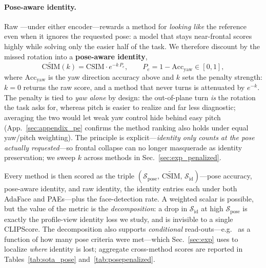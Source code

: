 \paragraph{Pose-aware identity.} Raw \csim{}---under either encoder---rewards
a method for \emph{looking like} the reference even when it ignores the
requested pose: a model that stays near-frontal scores highly while solving
only the easier half of the task. We therefore discount \csim{} by the missed
rotation into a \textbf{pose-aware identity},
\begin{equation}
\widetilde{\mathrm{CSIM}}(k)=\mathrm{CSIM}\cdot e^{-k\,P_e},\qquad
P_e=1-\mathrm{Acc_{yaw}}\in[0,1],
\label{eq:posepenalty}
\end{equation}
where $\mathrm{Acc_{yaw}}$ is the yaw direction accuracy above and $k$ sets
the penalty strength: $k{=}0$ returns the raw score, and a method that never
turns is attenuated by $e^{-k}$. The penalty is tied to \emph{yaw alone} by
design: the out-of-plane turn \emph{is} the rotation the task asks for,
whereas pitch is easier to realize and far less diagnostic; averaging the two
would let weak yaw control hide behind easy pitch
(App.~\ref{sec:appendix_pe} confirms the method ranking also holds under equal
yaw/pitch weighting). The principle is explicit---\emph{identity only counts
at the pose actually requested}---so frontal collapse can no longer masquerade
as identity preservation; we sweep $k$ across methods in
Sec.~\ref{sec:exp_penalized}.

Every method is then scored as the triple
$(\mathcal{S}_{\mathrm{pose}},\,\widetilde{\mathrm{CSIM}},\,
\mathcal{S}_{\mathrm{id}})$---pose accuracy, pose-aware identity, and raw
identity, the identity entries each under both AdaFace and PAEs---plus the
face-detection rate. A weighted scalar is possible, but the value of the
metric is the \emph{decomposition}: a drop in $\mathcal{S}_{\mathrm{id}}$ at
high $\mathcal{S}_{\mathrm{pose}}$ is exactly the profile-view identity loss
we study, and is invisible to a single CLIPScore. The decomposition also
supports \emph{conditional} read-outs---e.g.\ \csim{} as a function of how
many pose criteria were met---which Sec.~\ref{sec:exp} uses to localize
\emph{where} identity is lost; aggregate cross-method scores are reported in
Tables~\ref{tab:sota_pose} and~\ref{tab:posepenalized}.
